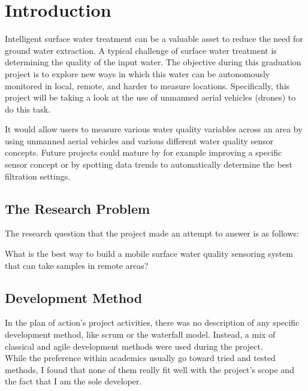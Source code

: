 \newpage
\section{Introduction}

Intelligent surface water treatment can be a valuable asset to reduce the need for ground water extraction. A typical challenge of surface water treatment is determining the quality of the input water. The objective during this graduation project is to explore new ways in which this water can be autonomously monitored in local, remote, and harder to measure locations. Specifically, this project will be taking a look at the use of unmanned aerial vehicles (drones) to do this task. 

It would allow users to measure various water quality variables across an area by using unmanned aerial vehicles and various different water quality sensor concepts. Future projects could mature by for example improving a specific sensor concept or by spotting data trends to automatically determine the best filtration settings.



\subsection{The Research Problem}
The research question that the project made an attempt to answer is as follows:\vspace{3mm}

\large{What is the best way to build a mobile surface water quality sensoring system that can take samples in remote areas?}\vspace{3mm}\\
\normalsize


\subsection{Development Method}
In the plan of action's project activities, there was no description of any specific development method, like scrum or the waterfall model. Instead, a mix of classical and agile development methods were used during the project.\\

While the preference within academics usually go toward tried and tested methods, I found that none of them really fit well with the project's scope and the fact that I am the sole developer.\\

